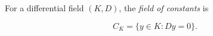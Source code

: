 For a differential field $(K, D)$, the \textit{field of constants} is

$$C_K = \{y \in K : Dy = 0\}.$$
